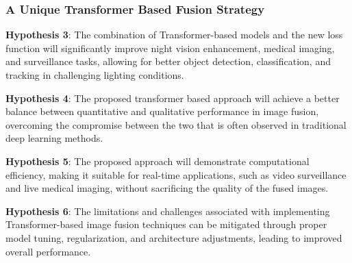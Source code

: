 \subsubsection{A Unique Transformer Based Fusion Strategy}

\begin{list}{}{}
    \item \textbf{Hypothesis 3}: The combination of Transformer-based models and the new loss function will significantly improve night vision enhancement, medical imaging, and surveillance tasks, allowing for better object detection, classification, and tracking in challenging lighting conditions.
    \item \textbf{Hypothesis 4}: The proposed transformer based approach will achieve a better balance between quantitative and qualitative performance in image fusion, overcoming the compromise between the two that is often observed in traditional deep learning methods.
    \item \textbf{Hypothesis 5}: The proposed approach will demonstrate computational efficiency, making it suitable for real-time applications, such as video surveillance and live medical imaging, without sacrificing the quality of the fused images.
    \item \textbf{Hypothesis 6}: The limitations and challenges associated with implementing Transformer-based image fusion techniques can be mitigated through proper model tuning, regularization, and architecture adjustments, leading to improved overall performance.
\end{list}